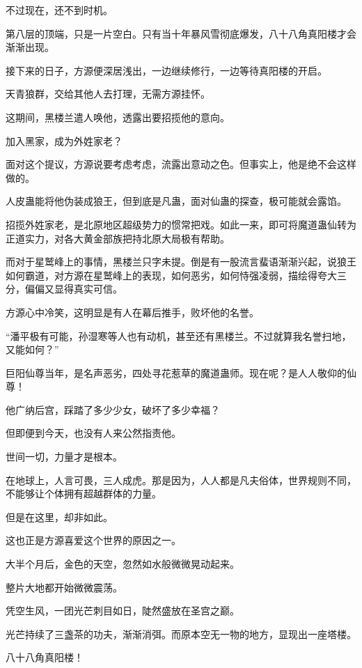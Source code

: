 \begin{this_body}
不过现在，还不到时机。

第八层的顶端，只是一片空白。只有当十年暴风雪彻底爆发，八十八角真阳楼才会渐渐出现。

接下来的日子，方源便深居浅出，一边继续修行，一边等待真阳楼的开启。

天青狼群，交给其他人去打理，无需方源挂怀。

这期间，黑楼兰遣人唤他，透露出要招揽他的意向。

加入黑家，成为外姓家老？

面对这个提议，方源说要考虑考虑，流露出意动之色。但事实上，他是绝不会这样做的。

人皮蛊能将他伪装成狼王，但到底是凡蛊，面对仙蛊的探查，极可能就会露馅。

招揽外姓家老，是北原地区超级势力的惯常把戏。如此一来，即可将魔道蛊仙转为正道实力，对各大黄金部族把持北原大局极有帮助。

而对于星鹫峰上的事情，黑楼兰只字未提。倒是有一股流言蜚语渐渐兴起，说狼王如何霸道，对方源在星鹫峰上的表现，如何恶劣，如何恃强凌弱，描绘得夸大三分，偏偏又显得真实可信。

方源心中冷笑，这明显是有人在幕后推手，败坏他的名誉。

“潘平极有可能，孙湿寒等人也有动机，甚至还有黑楼兰。不过就算我名誉扫地，又能如何？”

巨阳仙尊当年，是名声恶劣，四处寻花惹草的魔道蛊师。现在呢？是人人敬仰的仙尊！

他广纳后宫，踩踏了多少少女，破坏了多少幸福？

但即便到今天，也没有人来公然指责他。

世间一切，力量才是根本。

在地球上，人言可畏，三人成虎。那是因为，人人都是凡夫俗体，世界规则不同，不能够让个体拥有超越群体的力量。

但是在这里，却非如此。

这也正是方源喜爱这个世界的原因之一。

大半个月后，金色的天空，忽然如水般微微晃动起来。

整片大地都开始微微震荡。

凭空生风，一团光芒刺目如日，陡然盛放在圣宫之巅。

光芒持续了三盏茶的功夫，渐渐消弭。而原本空无一物的地方，显现出一座塔楼。

八十八角真阳楼！

\end{this_body}

